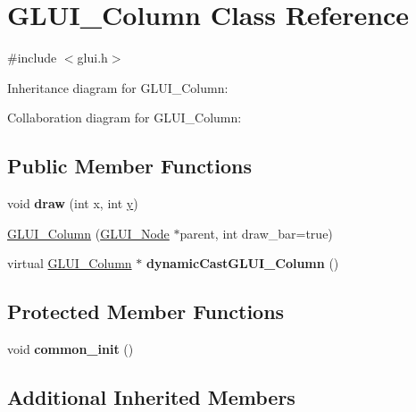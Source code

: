 \hypertarget{class_g_l_u_i___column}{\section{G\+L\+U\+I\+\_\+\+Column Class Reference}
\label{class_g_l_u_i___column}
}


{\ttfamily \#include $<$glui.\+h$>$}



Inheritance diagram for G\+L\+U\+I\+\_\+\+Column\+:


Collaboration diagram for G\+L\+U\+I\+\_\+\+Column\+:
\subsection*{Public Member Functions}
\begin{DoxyCompactItemize}
\item 
\hypertarget{class_g_l_u_i___column_aefa72a27e5a6ba5e86f684b6a5b5f63e}{void {\bfseries draw} (int x, int \hyperlink{_ice_utils_8h_aa7ffaed69623192258fb8679569ff9ba}{y})}\label{class_g_l_u_i___column_aefa72a27e5a6ba5e86f684b6a5b5f63e}

\item 
\hyperlink{class_g_l_u_i___column_a309d2c36583fb571763c95d8ae3bbaa3}{G\+L\+U\+I\+\_\+\+Column} (\hyperlink{class_g_l_u_i___node}{G\+L\+U\+I\+\_\+\+Node} $\ast$parent, int draw\+\_\+bar=true)
\item 
\hypertarget{class_g_l_u_i___column_a0a902459ab9733b7b3fc8c36fd2b3207}{virtual \hyperlink{class_g_l_u_i___column}{G\+L\+U\+I\+\_\+\+Column} $\ast$ {\bfseries dynamic\+Cast\+G\+L\+U\+I\+\_\+\+Column} ()}\label{class_g_l_u_i___column_a0a902459ab9733b7b3fc8c36fd2b3207}

\end{DoxyCompactItemize}
\subsection*{Protected Member Functions}
\begin{DoxyCompactItemize}
\item 
\hypertarget{class_g_l_u_i___column_af5aa315100428399f2a7920fb9eb53b7}{void {\bfseries common\+\_\+init} ()}\label{class_g_l_u_i___column_af5aa315100428399f2a7920fb9eb53b7}

\end{DoxyCompactItemize}
\subsection*{Additional Inherited Members}


